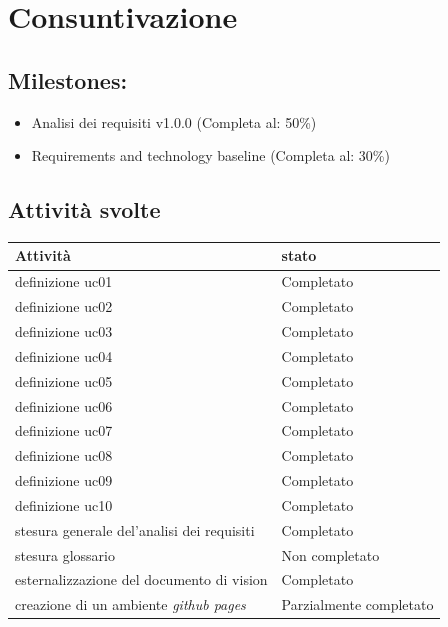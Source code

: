 \section{Consuntivazione}

\subsection{Milestones:}
\begin{itemize}
    \item Analisi dei requisiti v1.0.0 (Completa al: 50\%)
    \item Requirements and technology baseline (Completa al: 30\%)
\end{itemize}

\subsection{Attività svolte}


\begin{center}
    \begin{tabularx}{\textwidth}{X l}
        
        \rowcolor{gray!30} \textbf{Attività} & \textbf{stato}\\
        
        \hline

        definizione uc01 & Completato \\
        \rowcolor{gray!10}definizione uc02 & Completato \\
        definizione uc03   & Completato \\
        \rowcolor{gray!10}definizione uc04 & Completato \\
        definizione uc05 & Completato \\
        \rowcolor{gray!10}definizione uc06 & Completato \\
        definizione uc07 & Completato \\
        \rowcolor{gray!10}definizione uc08 & Completato \\
        definizione uc09   & Completato \\
        \rowcolor{gray!10}definizione uc10 & Completato \\
        stesura generale del'analisi dei requisiti & Completato\\
        \rowcolor{gray!10}stesura glossario & Non completato\\
        esternalizzazione del documento di vision & Completato\\
        \rowcolor{gray!10}creazione di un ambiente \textit{github pages} & Parzialmente completato\\
    \end{tabularx}
\end{center}



